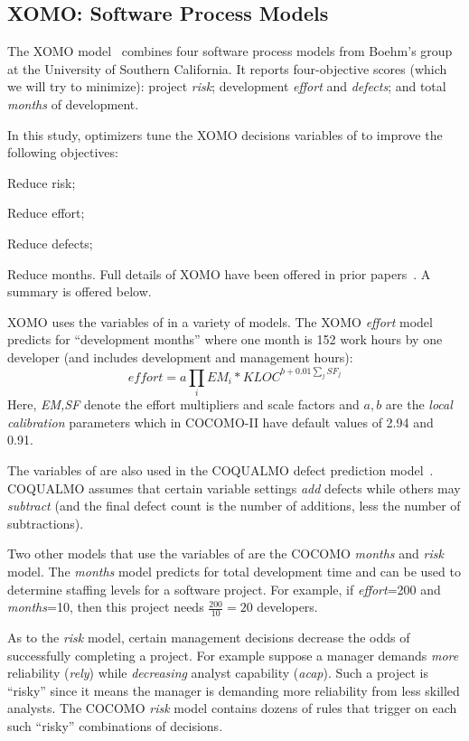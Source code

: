
\subsection{XOMO: Software Process Models}\label{sec:xomoIs}

The XOMO model~\cite{me07f,me09a,me09e} combines four software process models from Boehm’s group at the University of Southern California.
It reports four-objective scores (which we will try to minimize): project {\em risk}; development {\em effort} and {\em defects}; and total {\em months} of development.


In this study, optimizers tune the XOMO  decisions variables of 
to improve the following objectives:
\bi
\item Reduce risk;  
\item Reduce effort;
\item Reduce defects;
\item Reduce months.
\ei
Full details of XOMO have been offered in prior papers~\cite{me07f,me09a,me09e}. A summary is offered below.

XOMO uses the variables of    in a variety of models. The XOMO {\em effort} model predicts for 
``development months'' where one month
is 152 work hours by one developer (and includes development and management hours): 
\begin{equation}\label{eq:cocII}
\mathit{effort}=a\prod_i EM_i *\mathit{KLOC}^{b+0.01\sum_j SF_j}
\end{equation}
Here, {\em EM,SF} denote the effort multipliers and scale
factors and
 $a,b$ are the {\em local calibration} parameters which in COCOMO-II
have default values of 2.94 and 0.91.

The variables of  are also  used in
the COQUALMO defect prediction
model~\cite{boehm00b}.  COQUALMO assumes that
certain variable settings {\em add} defects while
others may {\em subtract} (and the final defect count is the number of additions, less the
number of subtractions). 

Two other models that use the variables of  are the COCOMO {\em months} and {\em risk} model.
The {\em months} model predicts for total development time and   can be used to determine staffing levels
for a software project. For example, if {\em effort}=200  
and {\em months}=10, then this project needs 
$\frac{200}{10} =20$
developers.

As to the {\em risk} model, certain management decisions decrease the 
odds of successfully completing a project. For example suppose a manager demands
{\em more}  reliability ({\em rely}) while  {\em decreasing} analyst capability ({\em acap}).
Such a project is ``risky'' since it means the manager is demanding more reliability from less skilled analysts.
The COCOMO {\em risk} model contains dozens of rules that trigger on each
such ``risky'' combinations of decisions. 

